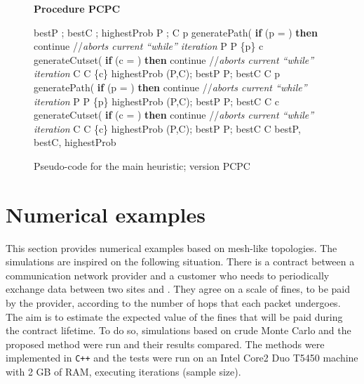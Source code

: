 \documentclass[a4paper]{article}
\begin{document}
\begin{figure}
\textbf{Procedure PCPC}
\begin{center}
\begin{algorithmic}[1]

\STATE bestP ; bestC ; highestProb 
	\STATE P ; C 
	\REPEAT
		\STATE p  generatePath(
	\STATE \textbf{if} (p = ) \textbf{then} continue //\emph{aborts current ``while'' iteration}
	\STATE P  P  \{p\}
	\REPEAT
		\STATE c  generateCutset(
	\STATE \textbf{if} (c = ) \textbf{then} continue //\emph{aborts current ``while'' iteration}
	\STATE C  C  \{c\}
		\STATE highestProb (P,C); bestP  P; bestC  C
	\ENDIF
	\REPEAT
		\STATE p  generatePath(
	\STATE \textbf{if} (p = ) \textbf{then} continue //\emph{aborts current ``while'' iteration}
	\STATE P  P  \{p\}
		\STATE highestProb (P,C); bestP  P; bestC  C
	\ENDIF
	\REPEAT
		\STATE c  generateCutset(
	\STATE \textbf{if} (c = ) \textbf{then} continue //\emph{aborts current ``while'' iteration}
	\STATE C  C  \{c\}
		\STATE highestProb (P,C); bestP  P; bestC  C
	\ENDIF
\ENDWHILE
\RETURN bestP, bestC, highestProb
\end{algorithmic}
\end{center}
\caption{Pseudo-code for the main heuristic; version PCPC}
\label{algo:mainPathsCuts}
\end{figure}
 


\section{Numerical examples}\label{s:tests}


This section provides numerical examples based on mesh-like topologies. The simulations are inspired on the following situation. There is a contract between a communication network provider and a customer who needs to periodically exchange data between two sites  and . They agree on a scale of fines, to be paid by the provider, according to the number of hops that each packet undergoes. The aim is to estimate the expected value of the fines that will be paid during the contract lifetime. To do so, simulations based on crude Monte Carlo and the proposed method were run and their results compared. The methods were implemented in \texttt{C++} and the tests were run on an Intel Core2 Duo T5450 machine with 2 GB of RAM, executing  iterations (sample size).
\end{document}
